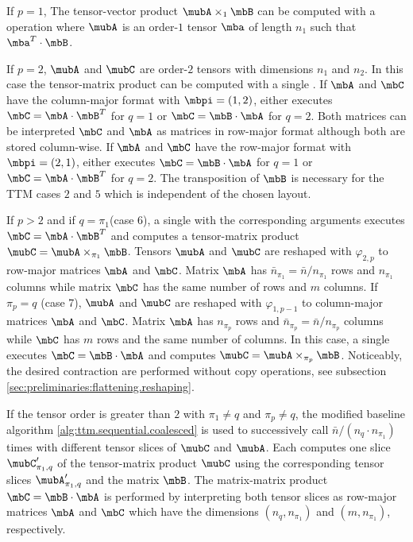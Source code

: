 If $p=1$, The tensor-vector product $\mubA \times_1 \mbB$ can be computed with a  operation where $\mubA$ is an order-$1$ tensor $\mba$ of length $n_1$ such that $\mba^T \cdot \mbB$.

If $p=2$, $\mubA$ and $\mubC$ are order-$2$ tensors with dimensions $n_1$ and $n_2$.
In this case the tensor-matrix product can be computed with a single .
If $\mbA$ and $\mbC$ have the column-major format with $\mbpi=(1,2)$,  either executes $\mbC = \mbA \cdot \mbB^T$ for $q =1$ or $\mbC = \mbB \cdot \mbA$ for $q=2$.
Both matrices can be interpreted $\mbC$ and $\mbA$ as matrices in row-major format although both are stored column-wise.
If $\mbA$ and $\mbC$ have the row-major format with $\mbpi=(2,1)$,  either executes $\mbC = \mbB \cdot \mbA$ for $q =1$ or $\mbC = \mbA \cdot \mbB^T$ for $q=2$. 
The transposition of $\mbB$ is necessary for the TTM cases $2$ and $5$ which is independent of the chosen layout.

If $p>2$ and if $q=\pi_1$(case 6), a single  with the corresponding arguments executes $\mbC = \mbA \cdot \mbB^T$ and computes a tensor-matrix product $\mubC = \mubA \times_{\pi_1} \mbB$.
Tensors $\mubA$ and $\mubC$ are reshaped with $\varphi_{2,p}$ to row-major matrices $\mbA$ and $\mbC$.
Matrix $\mbA$ has $\bar{n}_{\pi_1} = \bar{n} / n_{\pi_1}$ rows and $n_{\pi_1}$ columns while matrix $\mbC$ has the same number of rows and $m$ columns.
If $\pi_p=q$ (case 7), $\mubA$ and $\mubC$ are reshaped with $\varphi_{1,p-1}$ to column-major matrices $\mbA$ and $\mbC$.
Matrix $\mbA$ has $n_{\pi_p}$ rows and $\bar{n}_{\pi_p} =  \bar{n} / n_{\pi_p}$ columns while $\mbC$ has $m$ rows and the same number of columns.
In this case, a single  executes $\mbC = \mbB \cdot \mbA$ and computes $\mubC = \mubA \times_{\pi_p} \mbB$.
Noticeably, the desired contraction are performed without copy operations, see subsection \ref{sec:preliminaries:flattening.reshaping}. 

If the tensor order is greater than $2$ with $\pi_1\neq q$ and $\pi_p \neq q$, the modified baseline algorithm \ref{alg:ttm.sequential.coalesced} is used to successively call $\bar{n} / (n_q \cdot n_{\pi_1})$ times  with different tensor slices of $\mubC$ and $\mubA$.
Each  computes one slice $\mubC_{\pi_1,q}'$ of the tensor-matrix product $\mubC$ using the corresponding tensor slices $\mubA_{\pi_1,q}'$ and the matrix $\mbB$.
The matrix-matrix product $\mbC = \mbB \cdot \mbA$ is performed by interpreting both tensor slices as row-major matrices $\mbA$ and $\mbC$ which have the dimensions $(n_q,n_{\pi_1})$ and $(m,n_{\pi_1})$, respectively.

